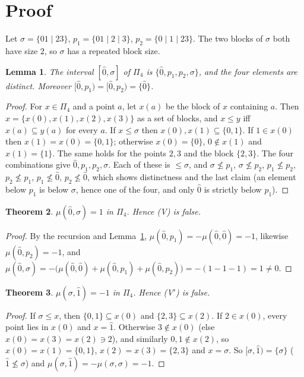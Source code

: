 \documentclass[11pt]{article}
\newtheorem{theorem}{Theorem}
\newtheorem{lemma}[theorem]{Lemma}
\theoremstyle{definition}
\begin{document}
\section{Proof}
Let $\sigma=\{01\mid23\}$, $p_1=\{01\mid2\mid3\}$, $p_2=\{0\mid1\mid23\}$. The two blocks of
$\sigma$ both have size $2$, so $\sigma$ has a repeated block size.

\begin{lemma}\label{lem:int}
The interval $[\hat0,\sigma]$ of $\Pi_4$ is $\{\hat0,p_1,p_2,\sigma\}$, and the four elements are
distinct. Moreover $[\hat0,p_1)=[\hat0,p_2)=\{\hat0\}$.
\end{lemma}
\begin{proof}
For $x\in\Pi_4$ and a point $a$, let $x(a)$ be the block of $x$ containing $a$. Then
$x=\{x(0),x(1),x(2),x(3)\}$ as a set of blocks, and $x\le y$ iff $x(a)\subseteq y(a)$ for every
$a$. If $x\le\sigma$ then $x(0),x(1)\subseteq\{0,1\}$. If $1\in x(0)$ then $x(1)=x(0)=\{0,1\}$;
otherwise $x(0)=\{0\}$, $0\notin x(1)$ and $x(1)=\{1\}$. The same holds for the points $2,3$
and the block $\{2,3\}$. The four combinations give $\hat0,p_1,p_2,\sigma$. Each of these is
$\le\sigma$, and $\sigma\not\le p_1$, $\sigma\not\le p_2$, $p_1\not\le p_2$, $p_2\not\le p_1$,
$p_1\not\le\hat0$, $p_2\not\le\hat0$, which shows distinctness and the last claim (an element
below $p_1$ is below $\sigma$, hence one of the four, and only $\hat0$ is strictly below $p_1$).
\end{proof}

\begin{theorem}\label{thm:main}
$\mu(\hat0,\sigma)=1$ in $\Pi_4$. Hence (V) is false.
\end{theorem}
\begin{proof}
By the recursion and Lemma~\ref{lem:int}, $\mu(\hat0,p_1)=-\mu(\hat0,\hat0)=-1$, likewise
$\mu(\hat0,p_2)=-1$, and
$\mu(\hat0,\sigma)=-\bigl(\mu(\hat0,\hat0)+\mu(\hat0,p_1)+\mu(\hat0,p_2)\bigr)=-(1-1-1)=1\neq0.$
\end{proof}

\begin{theorem}\label{thm:dual}
$\mu(\sigma,\hat1)=-1$ in $\Pi_4$. Hence (V$'$) is false.
\end{theorem}
\begin{proof}
If $\sigma\le x$, then $\{0,1\}\subseteq x(0)$ and $\{2,3\}\subseteq x(2)$. If $2\in x(0)$, every
point lies in $x(0)$ and $x=\hat1$. Otherwise $3\notin x(0)$ (else $x(0)=x(3)=x(2)\ni2$), and
similarly $0,1\notin x(2)$, so $x(0)=x(1)=\{0,1\}$, $x(2)=x(3)=\{2,3\}$ and $x=\sigma$. So
$[\sigma,\hat1)=\{\sigma\}$ ($\hat1\not\le\sigma$) and $\mu(\sigma,\hat1)=-\mu(\sigma,\sigma)=-1$.
\end{proof}
\end{document}
